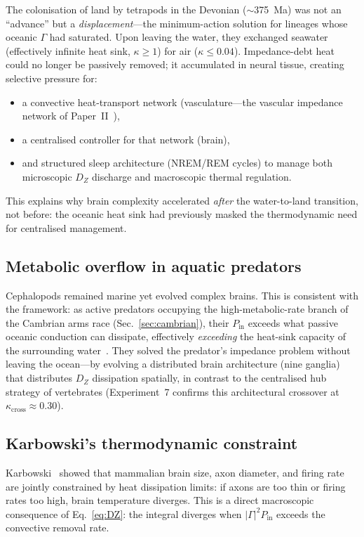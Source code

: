 ﻿\documentclass[aps,pre,twocolumn,superscriptaddress,floatfix]{revtex4-2}
\begin{document}
The colonisation of land by tetrapods in the Devonian
($\sim$375~Ma) was not an ``advance'' but a
\emph{displacement}---the minimum-action solution for
lineages whose oceanic $\Gamma$ had saturated.
Upon leaving the water, they exchanged seawater
(effectively infinite heat sink, $\kappa \ge 1$)
for air ($\kappa \le 0.04$).
Impedance-debt heat could no longer be passively
removed; it accumulated in neural tissue,
creating selective pressure for:
\begin{itemize}
  \item a convective heat-transport network
    (vasculature---the vascular impedance network
    of Paper~II~\cite{PaperII}),
  \item a centralised controller for that network (brain),
  \item and structured sleep architecture (NREM/REM cycles)
    to manage both microscopic $D_Z$ discharge
    and macroscopic thermal regulation.
\end{itemize}
This explains why brain complexity accelerated
\emph{after} the water-to-land transition, not before:
the oceanic heat sink had previously masked the
thermodynamic need for centralised management.

\subsection{Metabolic overflow in aquatic predators}

Cephalopods remained marine yet evolved complex brains.
This is consistent with the framework:
as active predators occupying the high-metabolic-rate
branch of the Cambrian arms race
(Sec.~\ref{sec:cambrian}),
their $P_{\mathrm{in}}$ exceeds what passive oceanic
conduction can dissipate,
effectively \emph{exceeding} the heat-sink capacity
of the surrounding water~\cite{Moroz2012}.
They solved the predator's impedance problem
without leaving the ocean---by evolving a distributed
brain architecture (nine ganglia) that
distributes $D_Z$ dissipation spatially,
in contrast to the centralised hub strategy
of vertebrates
(Experiment~7 confirms this architectural crossover
at $\kappa_{\mathrm{cross}} \approx 0.30$).

\subsection{Karbowski's thermodynamic constraint}

Karbowski~\cite{Karbowski2009} showed that mammalian
brain size, axon diameter, and firing rate are jointly
constrained by heat dissipation limits:
if axons are too thin or firing rates too high,
brain temperature diverges.
This is a direct macroscopic consequence of
Eq.~\eqref{eq:DZ}: the integral diverges when
$|\Gamma|^2 P_{\mathrm{in}}$ exceeds the
convective removal rate.
\end{document}
